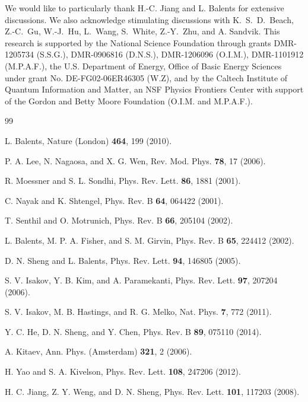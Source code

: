 \documentclass[prl,aps,epsf,showpacs,twocolumn]{revtex4}
\begin{document}
We would like to particularly thank H.-C. Jiang and L. Balents for extensive discussions.
We also acknowledge stimulating discussions with K.~S.~D.~Beach, Z.-C.~Gu, W.-J.~Hu, L.~Wang, S.~White, Z.-Y.~Zhu, and A. Sandvik.
This research is supported by the National Science Foundation through grants DMR-1205734 (S.S.G.), DMR-0906816 (D.N.S.), DMR-1206096 (O.I.M.), DMR-1101912 (M.P.A.F.),
the U.S. Department of Energy, Office of Basic Energy Sciences under grant No. DE-FG02-06ER46305 (W.Z),
and by the Caltech Institute of Quantum Information and Matter, an NSF Physics Frontiers Center with support of the Gordon and Betty Moore Foundation (O.I.M. and M.P.A.F.).


\begin{thebibliography}{99}

 L. Balents, Nature (London) \textbf{464}, 199 (2010).

 P. A. Lee, N. Nagaosa, and X. G. Wen, Rev. Mod. Phys. \textbf{78}, 17 (2006).

 R. Moessner and S. L. Sondhi, Phys. Rev. Lett. \textbf{86}, 1881 (2001).

 C. Nayak and K. Shtengel, Phys. Rev. B \textbf{64}, 064422 (2001).

 T. Senthil and O. Motrunich, Phys. Rev. B \textbf{66}, 205104 (2002).

 L. Balents, M. P. A. Fisher, and S. M. Girvin, Phys. Rev. B \textbf{65}, 224412 (2002).

 D. N. Sheng and L. Balents, Phys. Rev. Lett. \textbf{94}, 146805 (2005).

 S. V. Isakov, Y. B. Kim, and A. Paramekanti, Phys. Rev. Lett. \textbf{97}, 207204 (2006).

 S. V. Isakov, M. B. Hastings, and R. G. Melko, Nat. Phys. \textbf{7}, 772 (2011).

 Y. C. He, D. N. Sheng, and Y. Chen, Phys. Rev. B \textbf{89}, 075110 (2014).

 A. Kitaev, Ann. Phys. (Amsterdam) \textbf{321}, 2 (2006).

 H. Yao and S. A. Kivelson, Phys. Rev. Lett. \textbf{108}, 247206 (2012).


 H. C. Jiang, Z. Y. Weng, and D. N. Sheng, Phys. Rev. Lett. \textbf{101}, 117203 (2008).


\end{thebibliography}
\end{document}
